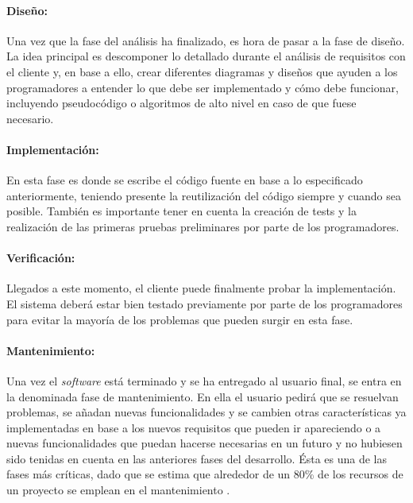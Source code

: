 \paragraph{Diseño:}

Una vez que la fase del análisis ha finalizado, es hora de pasar a la fase de diseño. La idea principal es descomponer lo detallado durante el análisis de requisitos con el cliente y, en base a ello, crear diferentes diagramas y diseños que ayuden a los programadores a entender lo que debe ser implementado y cómo debe funcionar, incluyendo pseudocódigo o algoritmos de alto nivel en caso de que fuese necesario.

\paragraph{Implementación:}

En esta fase es donde se escribe el código fuente en base a lo especificado anteriormente, teniendo presente la reutilización del código siempre y cuando sea posible. También es importante tener en cuenta la creación de tests y la realización de las primeras pruebas preliminares por parte de los programadores.

\paragraph{Verificación:}

Llegados a este momento, el cliente puede finalmente probar la implementación. El sistema deberá estar bien testado previamente por parte de los programadores para evitar la mayoría de los problemas que pueden surgir en esta fase.

\paragraph{Mantenimiento:}

Una vez el \textit{software} está terminado y se ha entregado al usuario final, se entra en la denominada fase de mantenimiento. En ella el usuario pedirá que se resuelvan problemas, se añadan nuevas funcionalidades y se cambien otras características ya implementadas en base a los nuevos requisitos que pueden ir  apareciendo o a nuevas funcionalidades que puedan hacerse necesarias en un futuro y no hubiesen sido tenidas en cuenta en las anteriores fases del desarrollo. Ésta es una de las fases más críticas, dado que se estima que alrededor de un 80\% de los recursos de un proyecto se emplean en el mantenimiento \cite{website:practicalsoftware}.

